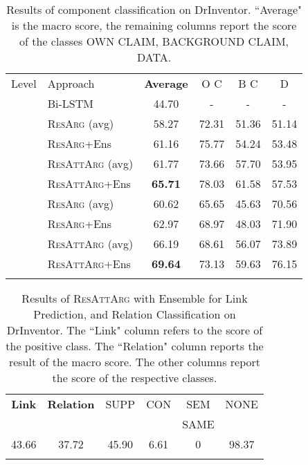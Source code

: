 \documentclass[journal]{IEEEtran}
\begin{document}
\begin{table}[t]
\centering
 \caption[Results of component classification on DrInventor.]{Results of component classification on DrInventor. ``Average" is the macro  score, the remaining columns report the  score of the classes OWN CLAIM, BACKGROUND CLAIM, DATA.}
 \label{table:resnets_resultsDrInvCC}
 \begin{tabular}{llcccc}
 \noalign{\smallskip}
 \hline
 \noalign{\smallskip}
   Level & Approach & \textbf{Average}   &   O C  &  B C  &   D\\
 \noalign{\smallskip}
 \hline
 \noalign{\smallskip}
 \multirow{5}{*}{Token}  &  Bi-LSTM~\cite{D18-1370} & 44.70   & -  & -  & -  \\
 \noalign{\smallskip}
 	  &   \textsc{ResArg} (avg)  &  58.27  & 72.31 & 51.36 & 51.14	\\
  &   \textsc{ResArg}+Ens  &  61.16   &  75.77    &	54.24	& 53.48		\\
	  &   \textsc{ResAttArg} (avg)  &   61.77 & 73.66 & 57.70 & 53.95	\\
  &   \textsc{ResAttArg}+Ens  &   \textbf{65.71}   &   78.03   &	61.58	&	57.53	\\
	 \noalign{\smallskip}
 \hline
 \noalign{\smallskip}
	\multirow{4}{*}{Component}   
	&   \textsc{ResArg} (avg)  & 60.62	&   65.65   &	45.63   &	70.56
	\\
	 &   \textsc{ResArg}+Ens   &  62.97 &	68.97	& 48.03    &	71.90
 \\
	&   \textsc{ResAttArg} (avg)  &  66.19 & 68.61 & 56.07 & 73.89	\\
	 &   \textsc{ResAttArg}+Ens   &   \textbf{69.64}    &   73.13    &    59.63	&   76.15     \\
\noalign{\smallskip}
 \hline
 \end{tabular}
\end{table}



\begin{table}[t]
\centering
 \caption[Results of \textsc{ResAttArg} with Ensemble for Link Prediction and Relation classification on DrInventor.]{Results of \textsc{ResAttArg} with Ensemble for Link Prediction, and Relation Classification on DrInventor. The ``Link" column refers to the  score of the positive class. The ``Relation" column reports the result of the macro  score. The other columns report the  score of the respective classes.}
 \label{table:resnets_resultsDrInvRC}
 \begin{tabular}{cccccc}
 \noalign{\smallskip}
 \hline
 \noalign{\smallskip}
    \textbf{Link}    &   \textbf{Relation}  &  SUPP     &   CON & SEM &   NONE    \\
    & & & & SAME & \\
 \noalign{\smallskip}
 \hline
 \noalign{\smallskip}
    43.66   &	 37.72	&   45.90   &  6.61  &  0   &   98.37	\\
\noalign{\smallskip}
 \hline
 \end{tabular}
\end{table}
\end{document}
